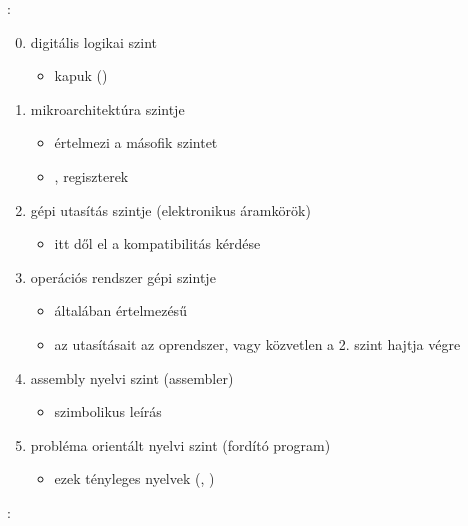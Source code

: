 \documentclass[main.tex]{subfiles}
\begin{document}
  \vspace{1em}
  {\large {}:}
  \begin{enumerate}
    \setcounter{enumi}{-1} 
    \item digitális logikai szint
    \begin{itemize}
      \item kapuk ()
    \end{itemize}
    
    \item mikroarchitektúra  szintje
    \begin{itemize}
      \item értelmezi a másofik szintet
      \item {}, regiszterek
    \end{itemize}
    
    \item gépi utasítás szintje (elektronikus áramkörök)
    \begin{itemize}
      \item itt dől el a kompatibilitás kérdése
    \end{itemize}
    
    \item operációs rendszer gépi szintje
    \begin{itemize}
      \item általában értelmezésű
      \item az utasításait az oprendszer,
      vagy közvetlen a 2. szint hajtja végre
    \end{itemize}
    
    \item assembly nyelvi szint (assembler)
    \begin{itemize}
      \item szimbolikus leírás
    \end{itemize}
    
    \item probléma orientált nyelvi szint (fordító program)
    \begin{itemize}
      \item ezek tényleges nyelvek (, )
    \end{itemize}
  \end{enumerate}

  {\large {}:}
  \vspace{1em}
\end{document}
